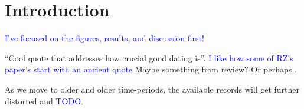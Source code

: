 \documentclass[draft]{agujournal2019}
\newcommand{\ijk}{\textcolor{blue}}
\begin{document}

%
%
%
%






\section{Introduction}\label{sec:intro}

\ijk{I've focused on the figures, results, and discussion first!}

``Cool quote that addresses how crucial good dating is''.
\ijk{I like how some of RZ's paper's start with an ancient quote}
Maybe something from  review?
Or perhaps .

As we move to older and older time-periods, the available records will get further distorted and \ijk{TODO}.
\end{document}
